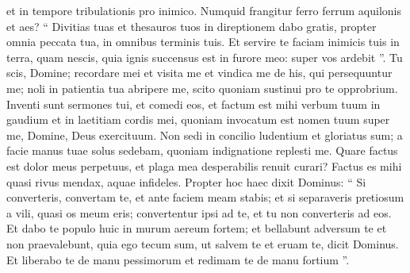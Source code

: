\begin{biblechapter}
\begin{biblechapter}
\begin{biblechapter}
\begin{biblechapter}
\begin{biblechapter}
\begin{biblechapter}
\begin{biblechapter}
\begin{biblechapter}
\begin{biblechapter}
\begin{biblechapter}
\begin{biblechapter}
\begin{biblechapter}
\begin{biblechapter}
\begin{biblechapter}
\begin{biblechapter}
 et in tempore tribulationis pro inimico.
 \verse Numquid frangitur ferro
 ferrum aquilonis et aes?
 \verse “ Divitias tuas et thesauros tuos
 in direptionem dabo gratis,
 propter omnia peccata tua,
 in omnibus terminis tuis.
 \verse Et servire te faciam inimicis tuis
 in terra, quam nescis,
 quia ignis succensus est in furore meo:
 super vos ardebit ”.
 \verse Tu scis, Domine;
 recordare mei et visita me
 et vindica me de his, qui persequuntur me;
 noli in patientia tua abripere me,
 scito quoniam sustinui pro te opprobrium.
 \verse Inventi sunt sermones tui, et comedi eos,
 et factum est mihi verbum tuum
 in gaudium et in laetitiam cordis mei,
 quoniam invocatum est nomen tuum super me,
 Domine, Deus exercituum.
 \verse Non sedi in concilio ludentium
 et gloriatus sum;
 a facie manus tuae solus sedebam,
 quoniam indignatione replesti me.
 \verse Quare factus est dolor meus perpetuus,
 et plaga mea desperabilis renuit curari?
 Factus es mihi quasi rivus mendax,
 aquae infideles.
 \verse Propter hoc haec dixit Dominus:
 “ Si converteris, convertam te,
 et ante faciem meam stabis;
 et si separaveris pretiosum a vili,
 quasi os meum eris;
 convertentur ipsi ad te,
 et tu non converteris ad eos.
 \verse Et dabo te populo huic
 in murum aereum fortem;
 et bellabunt adversum te
 et non praevalebunt,
 quia ego tecum sum,
 ut salvem te et eruam te,
 dicit Dominus.
 \verse Et liberabo te de manu pessimorum
 et redimam te de manu fortium ”.
 

\end{biblechapter}
\end{biblechapter}
\end{biblechapter}
\end{biblechapter}
\end{biblechapter}
\end{biblechapter}
\end{biblechapter}
\end{biblechapter}
\end{biblechapter}
\end{biblechapter}
\end{biblechapter}
\end{biblechapter}
\end{biblechapter}
\end{biblechapter}
\end{biblechapter}
